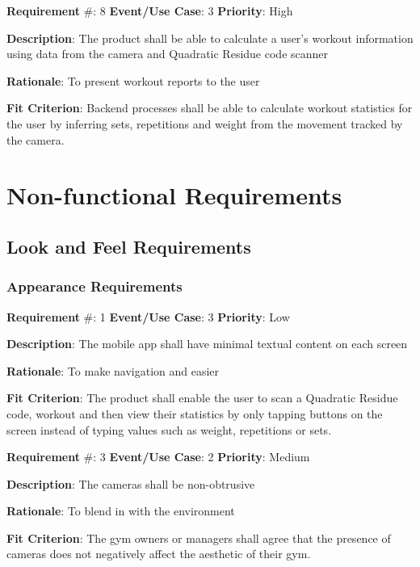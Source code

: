 \documentclass{article}
\newcommand\tab{\hspace*{2cm}}
\begin{document}
\medskip

\textbf{Requirement} \#: 8 \tab \textbf{Event/Use Case}: 3
\tab \textbf{Priority}: High

\textbf{Description}: The product shall be able to calculate a user’s workout information using data from the camera and Quadratic Residue code scanner

\textbf{Rationale}: To present workout reports to the user

\textbf{Fit Criterion}: Backend processes shall be able to calculate workout statistics for the user by inferring sets, repetitions and weight from the movement tracked by the camera.

\medskip

\newpage
\section{Non-functional Requirements}
\subsection{Look and Feel Requirements}

\subsubsection{Appearance Requirements}
\textbf{Requirement} \#: 1 \tab \textbf{Event/Use Case}: 3 \tab \textbf{Priority}: Low

\textbf{Description}: The mobile app shall have minimal textual content on each screen

\textbf{Rationale}: To make navigation and easier

\textbf{Fit Criterion}: The product shall enable the user to scan a Quadratic Residue code, workout and then view their statistics by only tapping buttons on the screen instead of typing values such as weight, repetitions or sets.

\medskip


\textbf{Requirement} \#: 3 \tab \textbf{Event/Use Case}: 2 \tab \textbf{Priority}: Medium

\textbf{Description}: The cameras shall be non-obtrusive

\textbf{Rationale}: To blend in with the environment

\textbf{Fit Criterion}: The gym owners or managers shall agree that the presence of cameras does not negatively affect the aesthetic of their gym.
\end{document}
